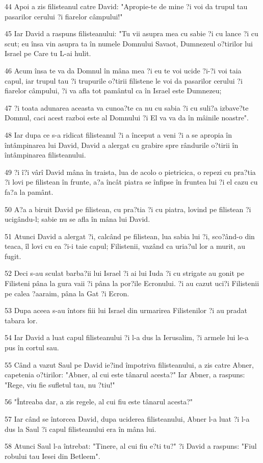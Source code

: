 \par 44 Apoi a zis filisteanul catre David: "Apropie-te de mine ?i voi da trupul tau pasarilor cerului ?i fiarelor câmpului!"
\par 45 Iar David a raspuns filisteanului: "Tu vii asupra mea cu sabie ?i cu lance ?i cu scut; eu însa vin asupra ta în numele Domnului Savaot, Dumnezeul o?tirilor lui Israel pe Care tu L-ai hulit.
\par 46 Acum însa te va da Domnul în mâna mea ?i eu te voi ucide ?i-?i voi taia capul, iar trupul tau ?i trupurile o?tirii filistene le voi da pasarilor cerului ?i fiarelor câmpului, ?i va afla tot pamântul ca în Israel este Dumnezeu;
\par 47 ?i toata adunarea aceasta va cunoa?te ca nu cu sabia ?i cu suli?a izbave?te Domnul, caci acest razboi este al Domnului ?i El va va da în mâinile noastre".
\par 48 Iar dupa ce s-a ridicat filisteanul ?i a început a veni ?i a se apropia în întâmpinarea lui David, David a alergat cu grabire spre rândurile o?tirii în întâmpinarea filisteanului.
\par 49 ?i î?i vârî David mâna în traista, lua de acolo o pietricica, o repezi cu pra?tia ?i lovi pe filistean în frunte, a?a încât piatra se înfipse în fruntea lui ?i el cazu cu fa?a la pamânt.
\par 50 A?a a biruit David pe filistean, cu pra?tia ?i cu piatra, lovind pe filistean ?i ucigându-l; sabie nu se afla în mâna lui David.
\par 51 Atunci David a alergat ?i, calcând pe filistean, lua sabia lui ?i, sco?ând-o din teaca, îl lovi cu ea ?i-i taie capul; Filistenii, vazând ca uria?ul lor a murit, au fugit.
\par 52 Deci s-au sculat barba?ii lui Israel ?i ai lui Iuda ?i cu strigate au gonit pe Filisteni pâna la gura vaii ?i pâna la por?ile Ecronului. ?i au cazut uci?i Filistenii pe calea ?aaraim, pâna la Gat ?i Ecron.
\par 53 Dupa aceea s-au întors fiii lui Israel din urmarirea Filistenilor ?i au pradat tabara lor.
\par 54 Iar David a luat capul filisteanului ?i l-a dus la Ierusalim, ?i armele lui le-a pus în cortul sau.
\par 55 Când a vazut Saul pe David ie?ind împotriva filisteanului, a zis catre Abner, capetenia o?tirilor: "Abner, al cui este tânarul acesta?" Iar Abner, a raspuns: "Rege, viu fie sufletul tau, nu ?tiu!"
\par 56 "Întreaba dar, a zis regele, al cui fiu este tânarul acesta?"
\par 57 Iar când se întorcea David, dupa uciderea filisteanului, Abner l-a luat ?i l-a dus la Saul ?i capul filisteanului era în mâna lui.
\par 58 Atunci Saul l-a întrebat: "Tinere, al cui fiu e?ti tu?" ?i David a raspuns: "Fiul robului tau Iesei din Betleem".

